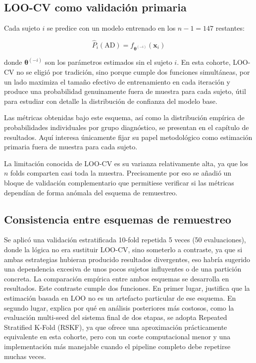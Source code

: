 \subsection{LOO-CV como validación primaria}

Cada sujeto $i$ se predice con un modelo entrenado en los $n-1 = 147$ restantes:

\begin{equation}
\hat{P}_i(\text{AD}) = f_{\boldsymbol{\theta}^{(-i)}}(\mathbf{x}_i)
\end{equation}

 donde $\boldsymbol{\theta}^{(-i)}$ son los parámetros estimados sin el sujeto $i$. En esta cohorte, LOO-CV no se eligió
 por tradición, sino porque cumple dos funciones simultáneas, por un lado maximiza el tamaño efectivo de entrenamiento
 en cada iteración y produce una probabilidad genuinamente fuera de muestra para cada sujeto, útil para estudiar con
 detalle la distribución de confianza del modelo base.

Las métricas obtenidas bajo este esquema, así como la distribución empírica de probabilidades individuales por grupo
diagnóstico, se presentan en el capítulo de resultados. Aquí interesa únicamente fijar su papel metodológico como
estimación primaria fuera de muestra para cada sujeto.

La limitación conocida de LOO-CV es su varianza relativamente alta, ya que los $n$ folds comparten casi toda la muestra. Precisamente por eso se añadió un bloque de validación complementario que permitiese verificar si las métricas dependían de forma anómala del esquema de remuestreo.

\subsection{Consistencia entre esquemas de remuestreo}

Se aplicó una validación estratificada 10-fold repetida 5 veces (50 evaluaciones), donde la lógica no era sustituir LOO-CV,
sino someterlo a contraste, ya que si ambas estrategias hubieran producido resultados divergentes, eso habría sugerido una
dependencia excesiva de unos pocos sujetos influyentes o de una partición concreta. La comparación empírica entre ambos
esquemas se desarrolla en resultados.
Este contraste cumple dos funciones. En primer lugar, justifica que la estimación basada en LOO no es un artefacto
particular de ese esquema. En segundo lugar, explica por qué en análisis posteriores más costosos, como la evaluación
multi-seed del sistema final de dos etapas, se adopta Repeated Stratified K-Fold (RSKF), ya que ofrece una aproximación
prácticamente equivalente en esta cohorte, pero con un coste computacional menor y una implementación más manejable
cuando el pipeline completo debe repetirse muchas veces.

